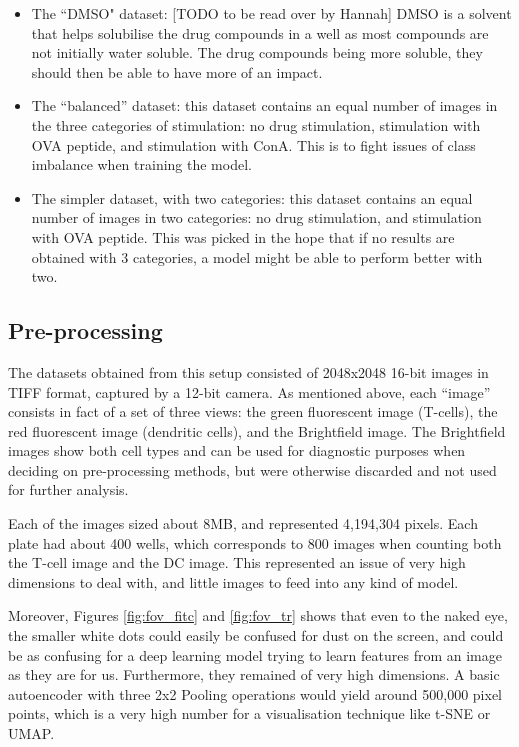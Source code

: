 \begin{itemize}
    \item The ``DMSO" dataset: [TODO to be read over by Hannah] DMSO is a solvent that helps solubilise the drug compounds in a well as most compounds are not initially water soluble. The drug compounds being more soluble, they should then be able to have more of an impact.
    \item The ``balanced” dataset: this dataset contains an equal number of images in the three categories of stimulation: no drug stimulation, stimulation with OVA peptide, and stimulation with ConA. This is to fight issues of class imbalance when training the model.
    \item The simpler dataset, with two categories: this  dataset contains an equal number of images in two categories: no drug stimulation, and stimulation with OVA peptide. This was picked in the hope that if no results are obtained with 3 categories, a model might be able to perform better with two.
\end{itemize}

\subsection{Pre-processing}
The datasets obtained from this setup consisted of 2048x2048 16-bit images in TIFF format, captured by a 12-bit camera. As mentioned above, each ``image” consists in fact of a set of three views: the green fluorescent image (T-cells), the red fluorescent image (dendritic cells), and the Brightfield image. The Brightfield images show both cell types and can be used for diagnostic purposes when deciding on pre-processing methods, but were otherwise discarded and not used for further analysis.

Each of the images sized about 8MB, and represented 4,194,304 pixels. Each plate had about 400 wells, which corresponds to 800 images when counting both the T-cell image and the DC image. This represented an issue of very high dimensions to deal with, and little images to feed into any kind of model.

Moreover, Figures \ref{fig:fov_fitc} and \ref{fig:fov_tr} shows that even to the naked eye, the smaller white dots could easily be confused for dust on the screen, and could be as confusing for a deep learning model trying to learn features from an image as they are for us. Furthermore, they remained of very high dimensions. A basic autoencoder with three 2x2 Pooling operations would yield around 500,000 pixel points, which is a very high number for a visualisation technique like t-SNE or UMAP.

